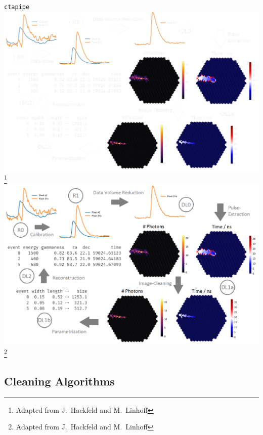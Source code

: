 \begin{frame}{\texttt{ctapipe}}
    {%
    \centering
    \includegraphics[height=0.9\textheight]{graphics/ctapipe_light.pdf}
    \vspace{-0.25cm}
    \footnote{\textcolor{white!85!black}{Adapted from J.~Hackfeld and M.~Linhoff}}
    }
    {%
    \centering
    \includegraphics[height=0.9\textheight]{graphics/ctapipe.png}
    \vspace{-0.25cm}
    \footnote{\textcolor{darkgray!85!black}{Adapted from J.~Hackfeld and M.~Linhoff}}
    }
\end{frame}

\subsection{Cleaning Algorithms}%
\label{sub:Cleaning_algorithms}

    {%
    
    }
    {%
    
    }

